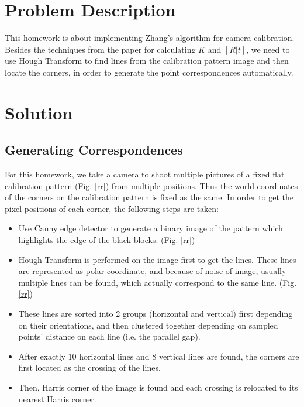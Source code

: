 \documentclass[12pt]{article}
\begin{document}
\makehwtitle%

\section{Problem Description}
This homework is about implementing Zhang's algorithm for camera calibration. Besides the techniques from the paper for calculating $K$ and $[R|t]$, we need to use Hough Transform to find lines from the calibration pattern image and then locate the corners, in order to generate the point correspondences automatically.

\section{Solution}
\subsection{Generating Correspondences}
For this homework, we take a camera to shoot multiple pictures of a fixed flat calibration pattern (Fig. \ref{rr}) from multiple positions. Thus the world coordinates of the corners on the calibration pattern is fixed as the same. In order to get the pixel positions of each corner, the following steps are taken:
\begin{itemize}
\item Use Canny edge detector to generate a binary image of the pattern which highlights the edge of the black blocks. (Fig. \ref{rr})
\item Hough Transform is performed on the image first to get the lines. These lines are represented as polar coordinate, and because of noise of image, usually multiple lines can be found, which actually correspond to the same line. (Fig. \ref{rr})
\item These lines are sorted into 2 groups (horizontal and vertical) first depending on their orientations, and then clustered together depending on sampled points' distance on each line (i.e. the parallel gap).
\item After exactly 10 horizontal lines and 8 vertical lines are found, the corners are first located as the crossing of the lines.
\item Then, Harris corner of the image is found and each crossing is relocated to its nearest Harris corner.
\end{itemize}
\end{document}
